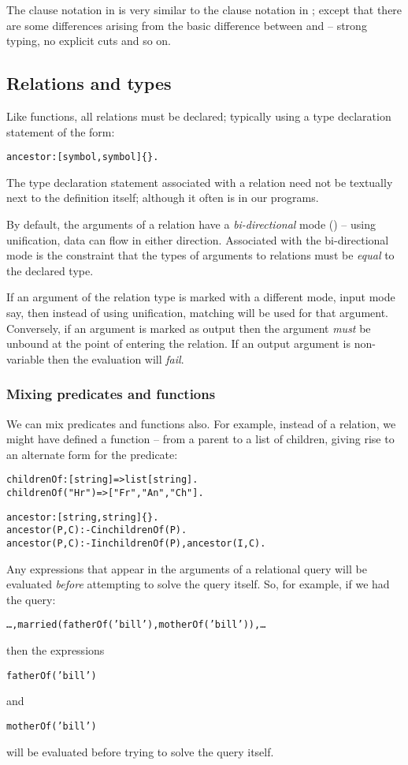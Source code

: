 The clause notation in \go is very similar to the clause notation in \prolog; except that there are some differences arising from the basic difference between \go and \prolog -- strong typing, no explicit cuts and so on.

\subsection{Relations and types}
\label{relation:types}
Like functions, all relations must be declared; typically using a type declaration statement of the form:
\begin{alltt}
ancestor:[symbol,symbol]\{\}.
\end{alltt}
The type declaration statement associated with a relation need not be textually next to the definition itself; although it often is in our programs.

By default, the arguments of a relation have a \emph{bi-directional} mode (\q{-+}) -- using unification, data can flow in either direction. Associated with the bi-directional mode is the constraint that the types of arguments to relations must be \emph{equal} to the declared type.

If an argument of the relation type is marked with a different mode, input mode say, then instead of using unification, matching will be used for that argument. Conversely, if an argument is marked as output then the argument \emph{must} be unbound at the point of entering the relation. If an output argument is non-variable then the evaluation will \emph{fail}.

\subsubsection{Mixing predicates and functions}
We can mix predicates and functions also. For example, instead of a  relation, we might have defined a  function -- from a parent to a list of children, giving rise to an alternate form for the  predicate:
\begin{alltt}
childrenOf:[string]=>list[string].
childrenOf("Hr") => ["Fr","An","Ch"].

ancestor:[string,string]\{\}.
ancestor(P,C) :- C in childrenOf(P).
ancestor(P,C) :- I in childrenOf(P), ancestor(I,C).
\end{alltt}
Any expressions that appear in the arguments of a relational query will be evaluated \emph{before} attempting to solve the query itself. So, for example, if we had the query:
\begin{alltt}
\ldots,married(fatherOf('bill'),motherOf('bill')),\ldots
\end{alltt}
then the expressions
\begin{alltt}
fatherOf('bill')
\end{alltt}
and
\begin{alltt}
motherOf('bill')
\end{alltt}
will be evaluated before trying to solve the  query itself.

